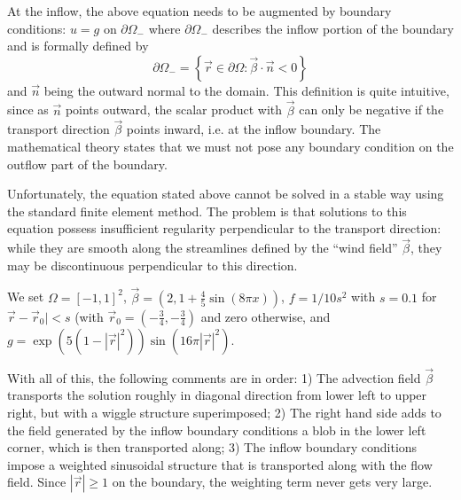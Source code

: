 At the inflow, the above equation needs to be augmented by boundary conditions: 
$u=g$ on $\partial\Omega_-$ where $\partial\Omega_-$ describes the inflow portion of the boundary and is formally defined by
\[
\partial\Omega_- = \left\{  \vec{r} \in \partial\Omega : \vec{\beta}\cdot\vec{n} <0  \right\}
\]
and $\vec{n}$ being the outward normal to the domain. This definition is quite intuitive, 
since as $\vec{n}$ points outward, the scalar product with $\vec{\beta}$ can only be negative if the transport direction $\vec{\beta}$ points inward, i.e. at the inflow boundary. The mathematical theory states that we must not pose any boundary condition on the outflow part of the boundary.

Unfortunately, the equation stated above cannot be solved in a stable way using the standard finite element method. The problem is that solutions to this equation possess insufficient regularity perpendicular to the transport direction: while they are smooth along the streamlines defined by the ``wind field'' $\vec{\beta}$, they may be discontinuous perpendicular to this direction.

We set $\Omega=[-1,1]^2$, $\vec{\beta}=(2, 1+\frac45\sin(8\pi x))$, $f=1/10s^2$ with $s=0.1$ for $\vec{r}-\vec{r}_0|<s$ (with $\vec{r}_0=(-\frac34,-\frac34)$ and zero otherwise, and $g=\exp(5(1-|\vec{r}|^2))\sin(16\pi |\vec{r}|^2)$.

With all of this, the following comments are in order:
1) The advection field $\vec{\beta}$ transports the solution roughly in diagonal direction from lower left to upper right, but with a wiggle structure superimposed; 2)     
The right hand side adds to the field generated by the inflow boundary conditions a blob in the lower left corner, which is then transported along; 3)
The inflow boundary conditions impose a weighted sinusoidal structure that is transported along with the flow field. Since $|\vec{r}|\ge 1$ on the boundary, the weighting term never gets very large.

